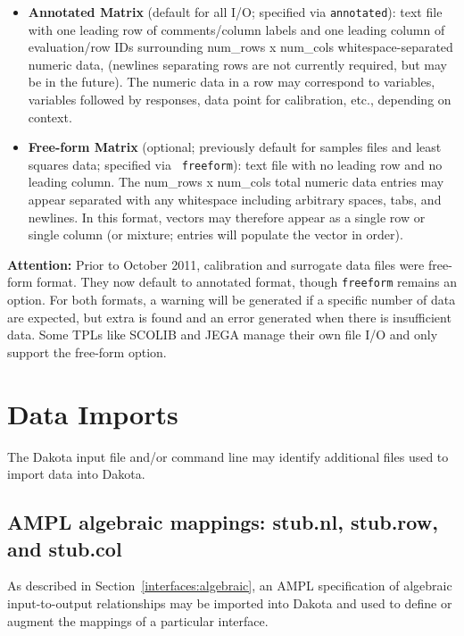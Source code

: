 \begin{itemize}
  \item {\bf Annotated Matrix} (default for all I/O; specified via
    {\tt annotated}): text file with one leading row of comments/column
    labels and one leading column of evaluation/row IDs surrounding
    num\_rows x num\_cols whitespace-separated numeric data, (newlines
    separating rows are not currently required, but may be in the
    future).  The numeric data in a row may correspond to variables,
    variables followed by responses, data point for calibration, etc.,
    depending on context.

   \item {\bf Free-form Matrix} (optional; previously default for
     samples files and least squares data; specified via {\tt
       freeform}): text file with no leading row and no leading
     column.  The num\_rows x num\_cols total numeric data entries may
     appear separated with any whitespace including arbitrary spaces,
     tabs, and newlines.  In this format, vectors may therefore appear
     as a single row or single column (or mixture; entries will
     populate the vector in order).
\end{itemize}

{\bf Attention:} Prior to October 2011, calibration and surrogate data
files were free-form format.  They now default to annotated format,
though {\tt freeform} remains an option.  For both formats, a warning
will be generated if a specific number of data are expected, but extra
is found and an error generated when there is insufficient data.  Some
TPLs like SCOLIB and JEGA manage their own file I/O and only support
the free-form option.

\section{Data Imports}\label{input:import}

The Dakota input file and/or command line may identify additional
files used to import data into Dakota.

\subsection{AMPL algebraic mappings: stub.nl, stub.row, and stub.col}

As described in Section~\ref{interfaces:algebraic}, an AMPL
specification of algebraic input-to-output relationships may be
imported into Dakota and used to define or augment the mappings of a
particular interface.

